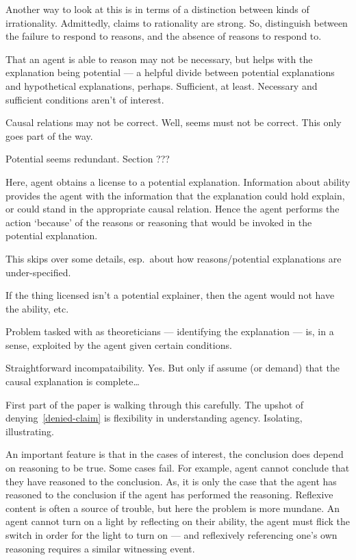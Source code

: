 \documentclass[10pt]{article}
\newcommand{\hozlinedash}[0]{%
  \noindent\hdashrule[0.5ex][c]{\textwidth}{.1pt}{2.5pt}
}
\begin{document}
\begin{note}[Rationality]
  Another way to look at this is in terms of a distinction between kinds of irrationality.
  Admittedly, claims to rationality are strong.
  So, distinguish between the failure to respond to reasons, and the absence of reasons to respond to.
\end{note}

\hozlinedash

That an agent is able to reason may not be necessary, but helps with the explanation being potential --- a helpful divide between potential explanations and hypothetical explanations, perhaps.
Sufficient, at least.
Necessary and sufficient conditions aren't of interest.


Causal relations may not be correct.
Well, seems must not be correct.
This only goes part of the way.

Potential seems redundant.
Section ???

Here, agent obtains a license to a potential explanation.
Information about ability provides the agent with the information that the explanation could hold explain, or could stand in the appropriate causal relation.
Hence the agent performs the action `because' of the reasons or reasoning that would be invoked in the potential explanation.

{
\color{red} This skips over some details, esp.\ about how reasons/potential explanations are under-specified.
}

If the thing licensed isn't a potential explainer, then the agent would not have the ability, etc.\

Problem tasked with as theoreticians --- identifying the explanation --- is, in a sense, exploited by the agent given certain conditions.

Straightforward incompataibility.
Yes.
But only if assume (or demand) that the causal explanation is complete\dots

{
  \color{red}
  First part of the paper is walking through this carefully.
}
The upshot of denying~\ref{denied-claim} is flexibility in understanding agency.
Isolating, illustrating.



An important feature is that in the cases of interest, the conclusion does depend on reasoning to be true.
Some cases fail.
For example, agent cannot conclude that they have reasoned to the conclusion.
As, it is only the case that the agent has reasoned to the conclusion if the agent has performed the reasoning.
Reflexive content is often a source of trouble, but here the problem is more mundane.
An agent cannot turn on a light by reflecting on their ability, the agent must flick the switch in order for the light to turn on --- and reflexively referencing one's own reasoning requires a similar witnessing event.
\end{document}

